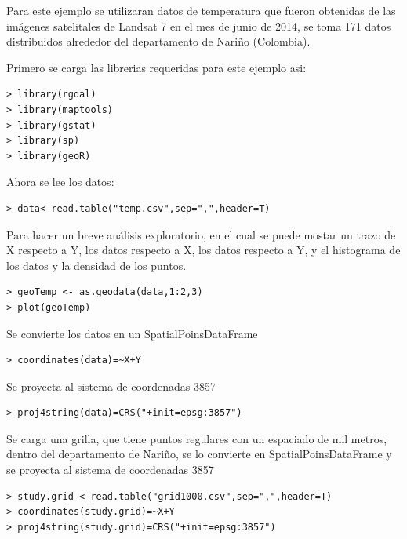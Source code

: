 Para este ejemplo se utilizaran datos de temperatura que fueron obtenidas de las imágenes satelitales de Landsat 7 en el mes de 
junio de 2014, se toma 171 datos distribuidos alrededor del departamento de Nariño (Colombia).

Primero se carga las librerias requeridas para este ejemplo asi:
\\
\begin{lstlisting}
> library(rgdal)
> library(maptools)
> library(gstat)
> library(sp)
> library(geoR)
\end{lstlisting}

Ahora se lee los datos:
\\
\begin{lstlisting}
> data<-read.table("temp.csv",sep=",",header=T)
\end{lstlisting}

Para hacer un breve análisis exploratorio, en el cual se puede mostar un trazo de X respecto a Y, los datos respecto a X, los datos respecto a Y, y 
el histograma de los datos y la densidad de los puntos.
\\
\begin{lstlisting}
> geoTemp <- as.geodata(data,1:2,3)
> plot(geoTemp)
\end{lstlisting}

Se convierte los datos en un SpatialPoinsDataFrame
\\
\begin{lstlisting}
> coordinates(data)=~X+Y
\end{lstlisting}

Se proyecta al sistema de coordenadas 3857
\\
\begin{lstlisting}
> proj4string(data)=CRS("+init=epsg:3857")
\end{lstlisting}

Se carga una grilla, que tiene puntos regulares con un espaciado de mil metros, dentro del departamento de Nariño,
se lo convierte en SpatialPoinsDataFrame y se proyecta al sistema de coordenadas 3857
\\
\begin{lstlisting}
> study.grid <-read.table("grid1000.csv",sep=",",header=T)
> coordinates(study.grid)=~X+Y
> proj4string(study.grid)=CRS("+init=epsg:3857")
\end{lstlisting}


